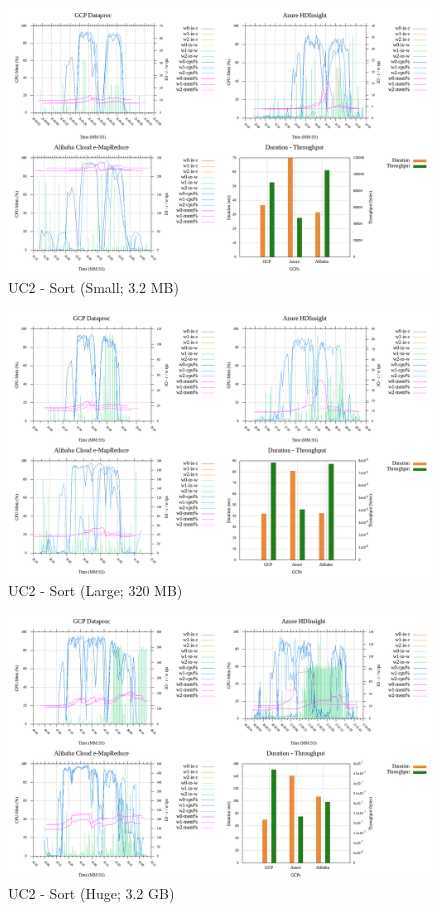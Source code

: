 \documentclass[review]{elsarticle}
\begin{document}
\begin{figure}[p]
	\includegraphics[width=\textwidth]{uc2-srt-s-cmidt}
	\caption{UC2 - Sort (Small; 3.2 MB)}
	\label{fig:uc2-srt-s-cmidt}
	\centering
\end{figure}

\begin{figure}[p]
	\includegraphics[width=\textwidth]{uc2-srt-l-cmidt}
	\caption{UC2 - Sort (Large; 320 MB)}
	\label{fig:uc2-srt-l-cmidt}
	\centering
\end{figure}

\begin{figure}[p]
	\includegraphics[width=\textwidth]{uc2-srt-h-cmidt}
	\caption{UC2 - Sort (Huge; 3.2 GB)}
	\label{fig:uc2-srt-h-cmidt}
	\centering
\end{figure}
\end{document}
